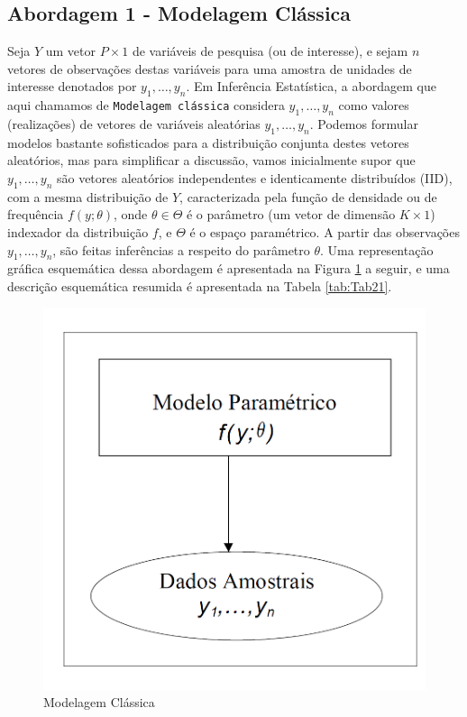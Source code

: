 \documentclass[]{book}
\theoremstyle{definition}
\theoremstyle{definition}
\theoremstyle{definition}
\theoremstyle{remark}
\begin{document}
\subsection{Abordagem 1 - Modelagem
Clássica}\label{abordagem-1---modelagem-classica}

Seja \(Y\) um vetor \(P \times 1\) de variáveis de pesquisa (ou de
interesse), e sejam \(n\) vetores de observações destas variáveis para
uma amostra de unidades de interesse denotados por \(y_1,\ldots ,y_n\).
Em Inferência Estatística, a abordagem que aqui chamamos de
\texttt{Modelagem\ clássica} considera \(y_1,\ldots ,y_n\) como valores
(realizações) de vetores de variáveis aleatórias \(y_1,\ldots ,y_n\).
Podemos formular modelos bastante sofisticados para a distribuição
conjunta destes vetores aleatórios, mas para simplificar a discussão,
vamos inicialmente supor que \(y_1,\ldots ,y_n\) são vetores aleatórios
independentes e identicamente distribuídos (IID), com a mesma
distribuição de \(Y\), caracterizada pela função de densidade ou de
frequência \(f(y;\theta)\), onde \(\theta \in \Theta\) é o parâmetro (um
vetor de dimensão \(K \times 1\)) indexador da distribuição \(f\), e
\(\Theta\) é o espaço paramétrico. A partir das observações
\(y_1,\ldots ,y_n\), são feitas inferências a respeito do parâmetro
\(\theta\). Uma representação gráfica esquemática dessa abordagem é
apresentada na Figura \ref{fig:modclas} a seguir, e uma descrição
esquemática resumida é apresentada na Tabela \ref{tab:Tab21}.

\begin{figure}
\centering
\includegraphics{Figuras/fig21.png}
\caption{\label{fig:modclas}Modelagem Clássica}
\end{figure}
\end{document}
